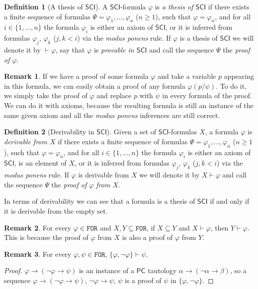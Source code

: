 \documentclass{article}
\theoremstyle{definition}
\newtheorem{definition}{Definition}[section]
\theoremstyle{definition}
\theoremstyle{definition}
\newtheorem{remark}{Remark}[section]
\newcommand*{\ra}{\rightarrow}
\newcommand*{\FOR}{\texttt{FOR}}
\newcommand{\SCI}{$\mathsf{SCI}$\xspace}
\newcommand{\PC}{$\mathsf{PC}$\xspace}
\begin{document}
\begin{definition}[A thesis of \SCI]
    A \SCI-formula $\varphi$ is \emph{a thesis of \SCI} if there exists a finite sequence of formulas $\Psi = \varphi_1, ..., \varphi_n$ ($n \geq 1$), such that $\varphi = \varphi_n$, and for all $i \in \{1, ..., n\}$ the formula $\varphi_i$ is either an axiom of \SCI, or it is inferred from formulas $\varphi_j$, $\varphi_k$ ($j, k <i$) via the \emph{modus ponens} rule. If $\varphi$ is a thesis of \SCI we will denote it by $\vdash \varphi$, say that $\varphi$ is \emph{provable in \SCI} and call the sequence $\Psi$ the \emph{proof of $\varphi$}.
    \label{thesis}
\end{definition}
%
\begin{remark}
    \label{remark_proof_varphi}
    If we have a proof of some formula $\varphi$ and take a variable $p$ appearing in this formula, we can easily obtain a proof of any formula $\varphi(p/\psi)$. To do it, we simply take the proof of $\varphi$ and replace $p$ with $\psi$ in every formula of the proof. We can do it with axioms, because the resulting formula is still an instance of the same given axiom and all the \emph{modus ponens} inferences are still correct.
\end{remark}
%
\begin{definition}[Derivability in \SCI]
    Given a set of \SCI-formulas $X$, a formula $\varphi$ is \emph{derivable from $X$} if there exists a finite sequence of formulas $\Psi = \varphi_1, ..., \varphi_n$ ($n \geq 1$), such that $\varphi = \varphi_n$, and for all $i \in \{1, ..., n\}$ the formula $\varphi_i$ is either an axiom of \SCI, is an element of $X$, or it is inferred from formulas $\varphi_j$, $\varphi_k$ ($j, k <i$) via the \emph{modus ponens} rule. If $\varphi$ is derivable from $X$ we will denote it by $X \vdash \varphi$ and call the sequence $\Psi$ the \emph{proof of $\varphi$ from $X$}.
\end{definition}
%
In terms of derivability we can see that a formula is a thesis of \SCI if and
only if it is derivable from the empty set.

\begin{remark} For every $\varphi \in \FOR$ and $X, Y \subseteq \FOR$, if $X \subseteq Y$ and $X \vdash \varphi$, then $Y \vdash \varphi$. This is because the proof of $\varphi$ from $X$ is also a proof of $\varphi$ from $Y$.
\end{remark}

\begin{remark} For every $\varphi, \psi \in \FOR$, $\{\varphi, \lnot \varphi\} \vdash \psi$.
    \label{falsehood_proves_all}
    \begin{proof} $\varphi \ra (\lnot \varphi \ra \psi)$ is an instance of a \PC tautology $\alpha \ra (\lnot \alpha \ra \beta)$, so a sequence $\varphi \ra (\lnot \varphi \ra \psi)$, $\lnot \varphi \ra \psi$, $\psi$ is a proof of $\psi$ in $\{\varphi, \lnot \varphi\}$.
    \end{proof}
\end{remark}
\end{document}
